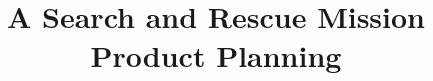 \documentclass{article}
\begin{document}
\frontmatter

\title{A Search and Rescue Mission\\
\normalsize{Product Planning}

\author{}
}
\end{document}

